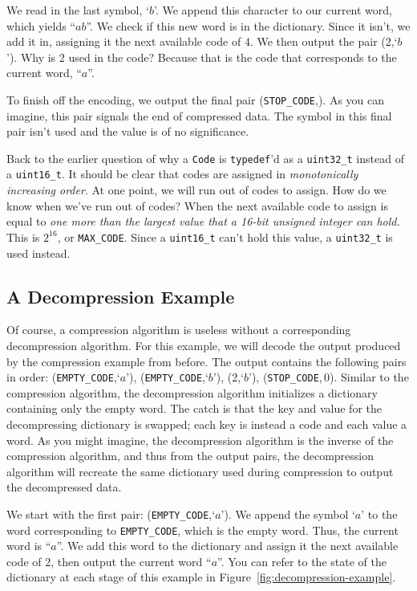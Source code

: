 We read in the last symbol, `$b$'. We append this character to our current word,
which yields ``$ab$''. We check if this new word is in the dictionary. Since it
isn't, we add it in, assigning it the next available code of 4. We then output
the pair (2,\;`$b$'). Why is 2 used in the code? Because that is the code that
corresponds to the current word, ``$a$''.

To finish off the encoding, we output the final pair (\texttt{STOP\_CODE},).
As you can imagine, this pair signals the end of compressed data. The symbol in
this final pair isn't used and the value is of no significance.

Back to the earlier question of why a \texttt{Code} is \texttt{typedef}'d as a
\texttt{uint32\_t} instead of a \texttt{uint16\_t}. It should be clear that
codes are assigned in \emph{monotonically increasing order}. At one point, we
will run out of codes to assign. How do we know when we've run out of codes?
When the next available code to assign is equal to \emph{one more than the
largest value that a 16-bit unsigned integer can hold.} This is $2^{16}$, or
\texttt{MAX\_CODE}. Since a \texttt{uint16\_t} can't hold this value, a
\texttt{uint32\_t} is used instead.

\subsection{A Decompression Example}

Of course, a compression algorithm is useless without a corresponding
decompression algorithm. For this example, we will decode the output produced by
the compression example from before. The output contains the following pairs in
order: (\texttt{EMPTY\_CODE},\;`$a$'), (\texttt{EMPTY\_CODE},\;`$b$'),
(2,\;`$b$'), (\texttt{STOP\_CODE},\,0). Similar to the compression algorithm,
the decompression algorithm initializes a dictionary containing only the empty
word. The catch is that the key and value for the decompressing dictionary is
swapped; each key is instead a code and each value a word. As you might imagine,
the decompression algorithm is the inverse of the compression algorithm, and
thus from the output pairs, the decompression algorithm will recreate the same
dictionary used during compression to output the decompressed data.

We start with the first pair: (\texttt{EMPTY\_CODE},\;`$a$'). We append the
symbol `$a$' to the word corresponding to \texttt{EMPTY\_CODE}, which is the
empty word. Thus, the current word is ``$a$''. We add this word to the
dictionary and assign it the next available code of 2, then output the current
word ``$a$''. You can refer to the state of the dictionary at each stage of this
example in Figure~\ref{fig:decompression-example}.


